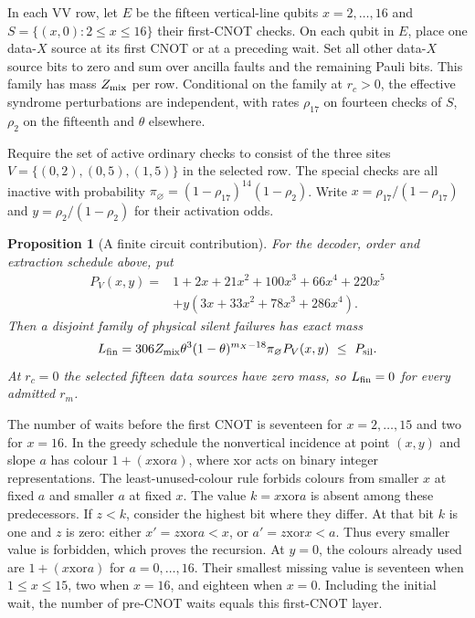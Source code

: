 \documentclass[10pt,twocolumn]{article}
\newtheorem{proposition}[theorem]{Proposition}
\theoremstyle{definition}
\begin{document}
In each VV row, let $E$ be the fifteen vertical-line qubits
$x=2,\ldots,16$ and $S=\{(x,0):2\le x\le16\}$ their first-CNOT
checks. On each qubit in $E$, place one data-$X$ source at its first
CNOT or at a preceding wait. Set all other data-$X$ source bits to
zero and sum over ancilla faults and the remaining Pauli bits. This
family has mass $Z_{\rm mix}$ per row. Conditional on the family at
$r_c>0$, the effective syndrome perturbations are independent, with
rates $\rho_{17}$ on fourteen checks of $S$, $\rho_2$ on the fifteenth
and $\theta$ elsewhere.

Require the set of active ordinary checks to consist of the three
sites $V=\{(0,2),(0,5),(1,5)\}$ in the selected row.
The special checks are all inactive with probability
$\pi_{\varnothing}=(1-\rho_{17})^{14}(1-\rho_2)$. Write
$x=\rho_{17}/(1-\rho_{17})$ and $y=\rho_2/(1-\rho_2)$ for their
activation odds.
\begin{proposition}[A finite circuit contribution]\label{prop:finite-sector}
For the decoder, order and extraction schedule above, put
\begin{equation}\label{eq:finite-polynomial}
\begin{split}
 P_V(x,y)={}&1+2x+21x^2+100x^3+66x^4+220x^5\\
            &+y(3x+33x^2+78x^3+286x^4).
\end{split}
\end{equation}
Then a disjoint family of physical silent failures has exact mass
\begin{equation}\label{eq:finite-anchor}
 L_{\rm fin}=306Z_{\rm mix}\theta^3(1-\theta)^{m_X-18}\pi_{\varnothing}P_V(x,y)
 \ \le\ P_{\rm sil}.
\end{equation}
At $r_c=0$ the selected fifteen data sources have zero mass, so
$L_{\rm fin}=0$ for every admitted $r_m$.
\end{proposition}

The number of waits before the first CNOT is seventeen for
$x=2,\ldots,15$ and two for $x=16$. In the greedy schedule the
nonvertical incidence at point
$(x,y)$ and slope $a$ has colour $1+(x\mathbin{\mathrm{xor}}a)$,
where xor acts on binary integer representations. The least-unused-colour
rule forbids colours from smaller $x$ at fixed $a$ and smaller $a$
at fixed $x$. The value $k=x\mathbin{\mathrm{xor}}a$ is absent among
these predecessors. If $z<k$, consider the highest bit where
they differ. At that bit $k$ is one and $z$ is zero: either
$x'=z\mathbin{\mathrm{xor}}a<x$, or
$a'=z\mathbin{\mathrm{xor}}x<a$. Thus every smaller value is forbidden,
which proves the recursion. At $y=0$, the colours already used are
$1+(x\mathbin{\mathrm{xor}}a)$ for $a=0,\ldots,16$. Their smallest
missing value is seventeen when $1\le x\le15$, two when $x=16$,
and eighteen when $x=0$. Including the initial wait, the number of
pre-CNOT waits equals this first-CNOT layer.
\end{document}
